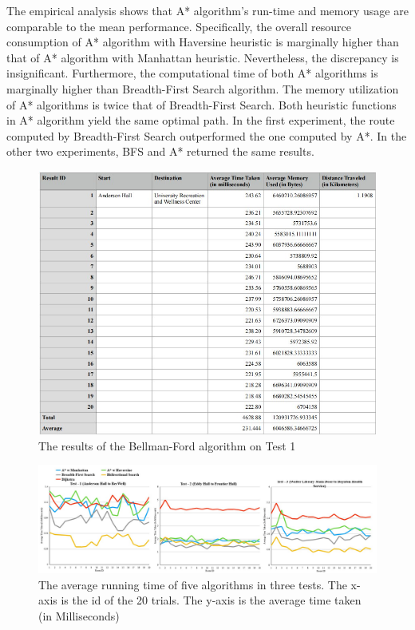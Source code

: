 \documentclass[12pt]{article}
\begin{document}
The empirical analysis shows that A* algorithm's run-time and memory usage are comparable to the mean performance. Specifically, the overall resource consumption of A* algorithm with Haversine heuristic is marginally higher than that of A* algorithm with Manhattan heuristic. Nevertheless, the discrepancy is insignificant. Furthermore, the computational time of both A* algorithms is marginally higher than Breadth-First Search algorithm. The memory utilization of A* algorithms is twice that of Breadth-First Search. Both heuristic functions in A* algorithm yield the same optimal path. In the first experiment, the route computed by Breadth-First Search outperformed the one computed by A*. In the other two experiments, BFS and A* returned the same results.

\begin{figure}[H]
\centering
\includegraphics[scale=0.6]{images/bf test1.jpg}
\caption{The results of the Bellman-Ford algorithm on Test 1}
\label{fig: bellman ford data}
\end{figure}

\begin{figure}[H]
\centering
\includegraphics[scale=0.37]{images/time taken data.jpg}
\caption{The average running time of five algorithms in three tests. The x-axis is the id of the 20 trials. The y-axis is the average time taken (in Milliseconds)}
\label{fig: avg time taken}
\end{figure}
\end{document}
